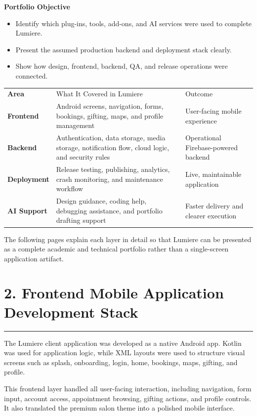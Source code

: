 \documentclass[11pt,a4paper]{article}
\newcommand{\PageTitle}[1]{\section*{#1}\vspace{2pt}\textcolor{LumiereGold}{\rule{\textwidth}{1.1pt}}\vspace{6pt}}
\newcommand{\SmallSpace}{\vspace{4pt}}
\begin{document}
\begin{tcolorbox}[colback=LumiereCream,colframe=LumiereLine,boxrule=0.6pt,arc=2mm,left=4mm,right=4mm,top=3mm,bottom=3mm]
\textbf{\textcolor{LumiereDark}{Portfolio Objective}}
\begin{itemize}
\item Identify which plug-ins, tools, add-ons, and AI services were used to complete Lumiere.
\item Present the assumed production backend and deployment stack clearly.
\item Show how design, frontend, backend, QA, and release operations were connected.
\end{itemize}
\end{tcolorbox}

\begin{tabularx}{\textwidth}{>{\bfseries}p{2.0cm} Y p{2.7cm}}
\color{white}Area & \color{white}What It Covered in Lumiere & \color{white}Outcome \\
Frontend & Android screens, navigation, forms, bookings, gifting, maps, and profile management & User-facing mobile experience \\
Backend & Authentication, data storage, media storage, notification flow, cloud logic, and security rules & Operational Firebase-powered backend \\
Deployment & Release testing, publishing, analytics, crash monitoring, and maintenance workflow & Live, maintainable application \\
AI Support & Design guidance, coding help, debugging assistance, and portfolio drafting support & Faster delivery and clearer execution \\
\end{tabularx}

\SmallSpace
The following pages explain each layer in detail so that Lumiere can be presented as a complete academic and technical portfolio rather than a single-screen application artifact.

\newpage
\PageTitle{2. Frontend Mobile Application Development Stack}

The Lumiere client application was developed as a native Android app. Kotlin was used for application logic, while XML layouts were used to structure visual screens such as splash, onboarding, login, home, bookings, maps, gifting, and profile.

This frontend layer handled all user-facing interaction, including navigation, form input, account access, appointment browsing, gifting actions, and profile controls. It also translated the premium salon theme into a polished mobile interface.
\end{document}
